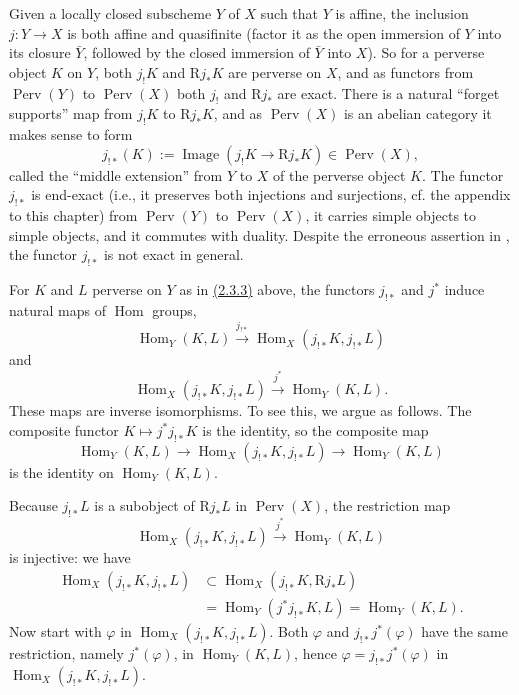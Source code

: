 Given a locally closed subscheme \(Y\) of \(X\) such that \(Y\) is affine, the
inclusion \(j:Y\to X\) is both affine and quasifinite (factor it as the open
immersion of \(Y\) into its closure \(\bar{Y}\), followed by the closed
immersion of \(\bar{Y}\) into \(X\)). So for a perverse object \(K\) on \(Y\),
both \(j_!K\) and \(\mathrm{R}j_*K\) are perverse on \(X\), and as functors
from \(\operatorname{Perv}(Y)\) to \(\operatorname{Perv}(X)\) both \(j_!\) and
\(\mathrm{R}j_*\) are exact. There is a natural ``forget supports'' map from
\(j_!K\) to \(\mathrm{R}j_*K\), and as \(\operatorname{Perv}(X)\) is an
abelian category it makes sense to form
\[
  j_{!*}(K):=\operatorname{Image}(j_!K\to \mathrm{R}j_*K)
  \in\operatorname{Perv}(X),
\]
called the ``middle extension'' from \(Y\) to \(X\) of the perverse object
\(K\). The functor \(j_{!*}\) is end-exact (i.e., it preserves both injections
and surjections, cf. the appendix to this chapter) from
\(\operatorname{Perv}(Y)\) to \(\operatorname{Perv}(X)\), it carries simple
objects to simple objects, and it commutes with duality. Despite the erroneous
assertion in \cite[8.1.4]{Ka-ESDE}, the functor \(j_{!*}\) is not exact in
general.

For \(K\) and \(L\) perverse on \(Y\) as in \hyperref[par:2.3.3]{(2.3.3)} above, the functors
\(j_{!*}\) and \(j^*\) induce natural maps of \(\operatorname{Hom}\) groups,
\[
  \operatorname{Hom}_Y(K,L)\xrightarrow{j_{!*}}
  \operatorname{Hom}_X(j_{!*}K,j_{!*}L)
\]
and
\[
  \operatorname{Hom}_X(j_{!*}K,j_{!*}L)\xrightarrow{j^*}
  \operatorname{Hom}_Y(K,L).
\]
These maps are inverse isomorphisms. To see this, we argue as follows. The
composite functor \(K\mapsto j^*j_{!*}K\) is the identity, so the composite map
\[
  \operatorname{Hom}_Y(K,L)\to
  \operatorname{Hom}_X(j_{!*}K,j_{!*}L)\to
  \operatorname{Hom}_Y(K,L)
\]
is the identity on \(\operatorname{Hom}_Y(K,L)\).

Because \(j_{!*}L\) is a subobject of \(\mathrm{R}j_*L\) in
\(\operatorname{Perv}(X)\), the restriction map
\[
  \operatorname{Hom}_X(j_{!*}K,j_{!*}L)\xrightarrow{j^*}
  \operatorname{Hom}_Y(K,L)
\]
is injective: we have
\[
\begin{aligned}
  \operatorname{Hom}_X(j_{!*}K,j_{!*}L)
  &\subset
  \operatorname{Hom}_X(j_{!*}K,\mathrm{R}j_*L)\\
  &=\operatorname{Hom}_Y(j^*j_{!*}K,L)
  =\operatorname{Hom}_Y(K,L).
\end{aligned}
\]
Now start with \(\varphi\) in \(\operatorname{Hom}_X(j_{!*}K,j_{!*}L)\). Both
\(\varphi\) and \(j_{!*}j^*(\varphi)\) have the same restriction, namely
\(j^*(\varphi)\), in \(\operatorname{Hom}_Y(K,L)\), hence
\(\varphi=j_{!*}j^*(\varphi)\) in
\(\operatorname{Hom}_X(j_{!*}K,j_{!*}L)\).


